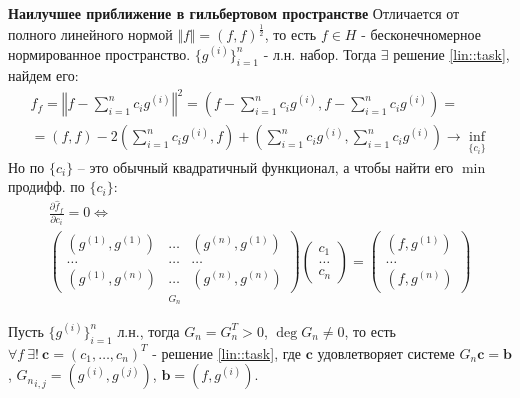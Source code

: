 \textbf{Наилучшее приближение в гильбертовом пространстве}
Отличается от полного линейного нормой $\Vert f\Vert=(f,f)^{\frac{1}{2}}$,
то есть $f\in H$ - бесконечномерное нормированное пространство.
$\{g^{(i)}\}^n_{i=1}$ - л.н. набор. Тогда
$\exists$ решение \eqref{lin::task}, найдем его:
\begin{multline*}
  \hat{f}_f=\left\Vert f-\sum_{i=1}^nc_ig^{(i)}\right\Vert^2 = \left(f-\sum_{i=1}^nc_ig^{(i)}, f-\sum_{i=1}^nc_ig^{(i)}\right)= \\
  = (f,f)-2\left(\sum_{i=1}^nc_ig^{(i)}, f\right)+\left(\sum_{i=1}^nc_ig^{(i)}, \sum_{i=1}^nc_ig^{(i)}\right)\rightarrow\inf_{\{c_i\}}
\end{multline*}
Но по $\{c_i\}$ -- это обычный квадратичный функционал, а чтобы найти его $\min$ продифф. по $\{c_i\}$:
\begin{multline*}
  \frac{\partial \hat{f}_f}{\partial c_i} = 0\Leftrightarrow  \\
  \underset{G_n}{\begin{pmatrix}
      (g^{(1)},g^{(1)}) & \ldots & (g^{(n)},g^{(1)}) \\
      \ldots            & \ldots & \ldots            \\
      (g^{(1)},g^{(n)}) & \ldots & (g^{(n)},g^{(n)})
    \end{pmatrix}}
  \begin{pmatrix}
    c_1    \\
    \ldots \\
    c_n
  \end{pmatrix} =
  \begin{pmatrix}
    (f,g^{(1)}) \\
    \ldots      \\
    (f,g^{(n)})
  \end{pmatrix}
\end{multline*}
\begin{theorem}
  Пусть $\{g^{(i)}\}_{i=1}^n$ л.н., тогда $G_n=G_n^T>0$, $\deg G_n\neq0$,
  то есть $\forall f\ \exists!\ \mathbf{c}=(c_1,\ldots,c_n)^T$ - решение \eqref{lin::task},
  где $\mathbf{c}$ удовлетворяет системе $G_n\mathbf{c}=\mathbf{b}$,
  ${G_n}_{i,j}=(g^{(i)},g^{(j)})$, $\mathbf{b}=(f,g^{(i)})$.
\end{theorem}
